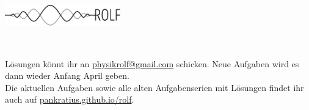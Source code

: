 \documentclass[a4paper]{article}
\begin{document}
	\vspace*{-1cm}
	\parbox{4cm}{\vspace{-0.2cm}\includegraphics[width=5cm]{../images/logo_scaled.pdf}}
	\parbox{10.6cm}{ \\
			\vspace*{-.5cm} }
		\vspace{0.5cm}

\thispagestyle{empty}
\begin{framed}
	\noindent
	\scriptsize
	 Lösungen könnt ihr an \href{mailto:physikrolf@gmail.com}{physikrolf@gmail.com} schicken.
	 Neue Aufgaben wird es dann wieder Anfang April geben.
	 \\ Die aktuellen Aufgaben sowie alle alten Aufgabenserien mit Lösungen findet ihr auch auf \url{pankratius.github.io/rolf}.
\end{framed}

\noindent




\end{document}
